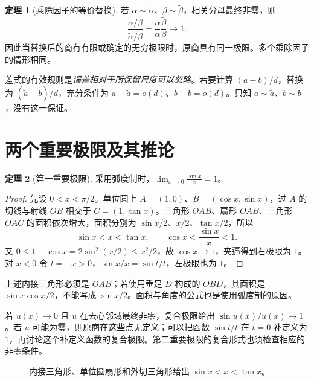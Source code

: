 \documentclass[UTF8,fontset=fandol,12pt,oneside,openany]{ctexrep}
\theoremstyle{definition}
\newtheorem{theorem}{定理}[chapter]
\begin{document}
\begin{theorem}[乘除因子的等价替换]
若 $\alpha\sim\widetilde\alpha$、$\beta\sim\widetilde\beta$，相关分母最终非零，则
\[
\frac{\alpha/\beta}{\widetilde\alpha/\widetilde\beta}
=\frac\alpha{\widetilde\alpha}\frac{\widetilde\beta}\beta\longrightarrow1.
\]
因此当替换后的商有有限或确定的无穷极限时，原商具有同一极限。多个乘除因子的情形相同。
\end{theorem}
差式的有效规则是\emph{误差相对于所保留尺度可以忽略}。若要计算 $(a-b)/d$，替换为 $(\widetilde a-\widetilde b)/d$，充分条件为
$a-\widetilde a=o(d)$、$b-\widetilde b=o(d)$。只知 $a\sim\widetilde a$、$b\sim\widetilde b$，没有这一保证。

\section{两个重要极限及其推论}
\label{lec:03:important}
\begin{theorem}[第一重要极限]
采用弧度制时，$\displaystyle\lim_{x\to0}\frac{\sin x}{x}=1$。
\end{theorem}
\begin{proof}
先设 $0<x<\pi/2$。单位圆上 $A=(1,0)$、$B=(\cos x,\sin x)$，过 $A$ 的切线与射线 $OB$ 相交于 $C=(1,\tan x)$。三角形 $OAB$、扇形 $OAB$、三角形 $OAC$ 的面积依次增大，面积分别为 $\sin x/2$、$x/2$、$\tan x/2$，所以
\[
\sin x<x<\tan x,\qquad \cos x<\frac{\sin x}{x}<1.
\]
又 $0\le1-\cos x=2\sin^2(x/2)\le x^2/2$，故 $\cos x\to1$，夹逼得到右极限为 $1$。对 $x<0$ 令 $t=-x>0$，$\sin x/x=\sin t/t$，左极限也为 $1$。
\end{proof}
上述内接三角形必须是 $OAB$；若使用垂足 $D$ 构成的 $OBD$，其面积是 $\sin x\cos x/2$，不能写成 $\sin x/2$。面积与角度的公式也是使用弧度制的原因。

若 $u(x)\to0$ 且 $u$ 在去心邻域最终非零，复合极限给出 $\sin u(x)/u(x)\to1$。若 $u$ 可能为零，则原商在这些点无定义；可以把函数 $\sin t/t$ 在 $t=0$ 补定义为 $1$，再讨论这个补定义函数的复合极限。第二重要极限的复合形式也须检查相应的非零条件。

\begin{figure}[htbp]
\centering
{}
\caption{内接三角形、单位圆扇形和外切三角形给出 $\sin x<x<\tan x$。}
\end{figure}
\end{document}
